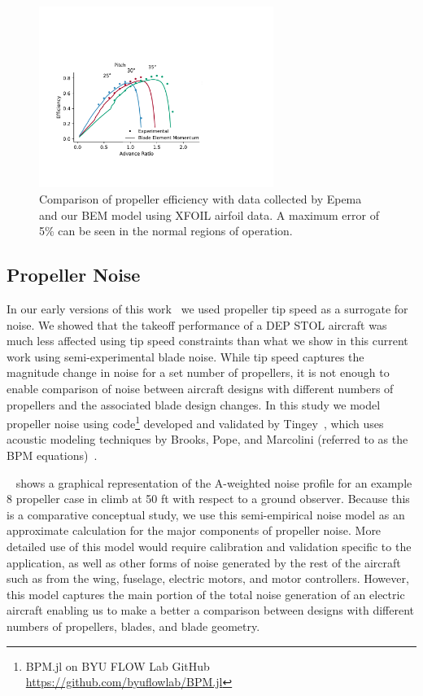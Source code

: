 \documentclass[conf]{new-aiaa}
\begin{document}
\begin{figure}[htbp]
    \centering
    \includegraphics[trim={2.0cm 3.75cm 8.75cm 6.5cm},clip,width=3.0in]{ETA_propval}
    \caption{Comparison of propeller efficiency with data collected by Epema~\cite{epema} and our BEM model using XFOIL airfoil data. A maximum error of 5\% can be seen in the normal regions of operation.}
    \label{fig:eta_prop}
\end{figure}


\subsection{Propeller Noise}

\label{sec:prop_noise}
In our early versions of this work~\cite{Moore:2018aa} we used propeller tip speed as a surrogate for noise. We showed that the takeoff performance of a DEP STOL aircraft was much less affected using tip speed constraints than what we show in this current work using semi-experimental blade noise. While tip speed captures the magnitude change in noise for a set number of propellers, it is not enough to enable comparison of noise between aircraft designs with different numbers of propellers and the associated blade design changes. In this study we model propeller noise using code\footnote{BPM.jl on BYU FLOW Lab GitHub \href{https://github.com/byuflowlab/BPM.jl}{https://github.com/byuflowlab/BPM.jl}} developed and validated by Tingey~\cite{eric_noise}, which uses acoustic modeling techniques by Brooks, Pope, and Marcolini (referred to as the BPM equations)~\cite{BROOKS:1986aa, BPM}.

~ shows a graphical representation of the A-weighted noise profile for an example 8 propeller case in climb at 50 ft with respect to a ground observer. Because this is a comparative conceptual study, we use this semi-empirical noise model as an approximate calculation for the major components of propeller noise. More detailed use of this model would require calibration and validation specific to the application, as well as other forms of noise generated by the rest of the aircraft such as from the wing, fuselage, electric motors, and motor controllers. However, this model captures the main portion of the total noise generation of an electric aircraft enabling us to make a better a comparison between designs with different numbers of propellers, blades, and blade geometry.
\end{document}
